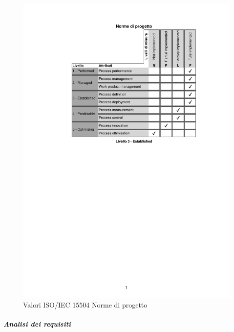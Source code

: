 \begin{figure}[H]
	\centering
	\includegraphics[scale=1]{images/resoconto/RR/normediprogetto-RR.pdf}
	\caption{Valori ISO/IEC 15504 Norme di progetto}	
\end{figure}
\newpage
\subparagraph{Analisi dei requisiti}
\noindent

